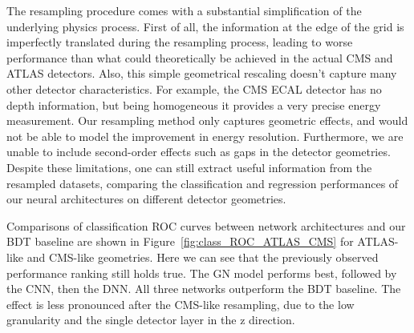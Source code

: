 
The resampling procedure comes with a substantial simplification of the underlying physics process. First of all, the information at the edge of the grid is imperfectly translated during the resampling process, leading to worse performance than what could theoretically be achieved in the actual CMS and ATLAS detectors. Also, this simple geometrical rescaling doesn't capture many other detector characteristics. For example, the CMS ECAL detector has no depth information, but being homogeneous it provides a very precise energy measurement. Our resampling method only captures geometric effects, and would not be able to model the improvement in energy resolution. Furthermore, we are unable to include second-order effects such as gaps in the detector geometries. Despite these limitations, one can still extract useful information from the resampled datasets, comparing the classification and regression performances of our neural architectures on different detector geometries.

Comparisons of classification ROC curves between network architectures and our BDT baseline are shown in Figure~\ref{fig:class_ROC_ATLAS_CMS} for ATLAS-like and CMS-like geometries. Here we can see that the previously observed performance ranking still holds true. The GN
model performs best, followed by the CNN, then the DNN. All three networks outperform the BDT baseline. The effect is less pronounced after the CMS-like resampling, due to the low granularity and the single detector layer in the z direction.


